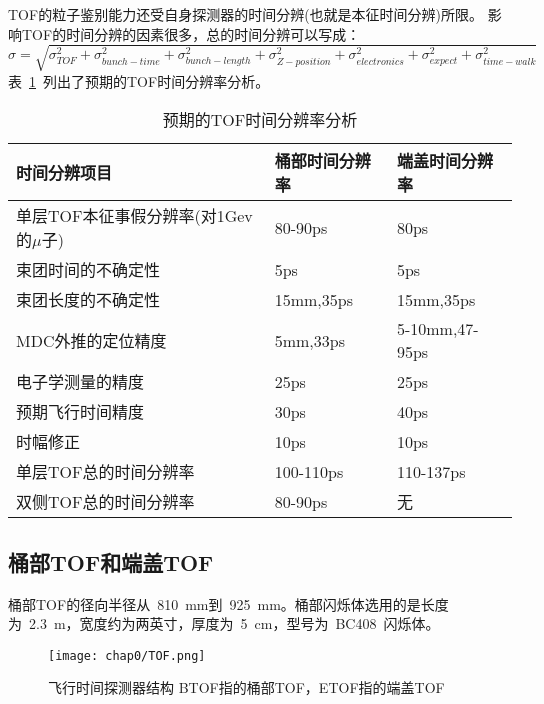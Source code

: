 TOF的粒子鉴别能力还受自身探测器的时间分辨(也就是本征时间分辨)所限。
影响TOF的时间分辨的因素很多，总的时间分辨可以写成：
\begin{displaymath}
\sigma=\sqrt{\sigma_{TOF}^{2}+\sigma_{bunch-time}^{2}+\sigma_{bunch-length}^{2}+\sigma_{Z-position}^{2}+\sigma_{electronics}^{2}+\sigma_{expect}^{2}+\sigma_{time-walk}^{2}}
\end{displaymath}
表~\ref{tbl:TOF-expect-sigma}~列出了预期的TOF时间分辨率分析。
\begin{table}[h]
    \centering
    \caption{\label{tbl:TOF-expect-sigma} 预期的TOF时间分辨率分析}
    \footnotesize
    \begin{tabular}{lll}
        \hline
        时间分辨项目& 桶部时间分辨率& 端盖时间分辨率 \\
        \hline
        单层TOF本征事假分辨率(对1Gev的$\mu$子)& 80-90ps&        80ps \\
        束团时间的不确定性&                     5ps&            5ps \\
        束团长度的不确定性&                     15mm,35ps&      15mm,35ps\\
        MDC外推的定位精度&                      5mm,33ps&       5-10mm,47-95ps\\
        电子学测量的精度&                       25ps&           25ps\\
        预期飞行时间精度&                       30ps&           40ps\\
        时幅修正&                               10ps&          10ps  \\
		单层TOF总的时间分辨率&                   100-110ps&     110-137ps           \\
		双侧TOF总的时间分辨率&                   80-90ps&       无                \\       
        \hline
    \end{tabular}
\end{table}

\subsection{桶部TOF和端盖TOF}
桶部TOF的径向半径从~810~mm到~925~mm。桶部闪烁体选用的是长度为~2.3~m，宽度约为两英寸，厚度为~5~cm，型号为~BC408~闪烁体。
\begin{figure}[!h]
  \centering
  \texttt{[image: chap0/TOF.png]}
  \caption{飞行时间探测器结构 BTOF指的桶部TOF，ETOF指的端盖TOF}
  \label{fig:TOF}
\end{figure}


